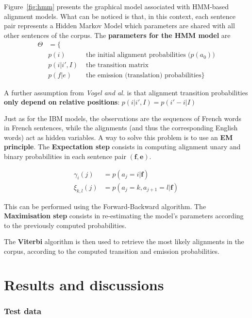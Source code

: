 \documentclass[final]{beamer}
\begin{document}
\begin{frame}[t]
\begin{multicols}{3}
Figure~\ref{fig:hmm} presents the graphical model associated with HMM-based alignment models. What can be noticed is that, in this context, each sentence pair represents a Hidden Markov Model which parameters are shared with all other sentences of the corpus.
The \textbf{parameters for the HMM model} are
\begin{align*}
\Theta &= \lbrace\\
& p(i) &\mbox{   the initial alignment probabilities ($p(a_0)$)}\\ 
& p(i|i',I) &\mbox{   the transition matrix}\\
& p(f|e) &\mbox{   the emission (translation) probabilities}\rbrace
\end{align*}

A further assumption from \textit{Vogel and al.} is that alignment transition probabilities \textbf{only depend on relative positions}: $p(i|i',I) = p(i'-i|I)$

Just as for the IBM models, the observations are the sequences of French words in French sentences, while the alignments (and thus the corresponding English words) act as hidden variables. A way to solve this problem is to use an \textbf{EM principle}.
The \textbf{Expectation step} consists in computing alignment unary and binary probabilities in each sentence pair $(\textbf{f},\textbf{e})$. 

\begin{align*}
\gamma_i(j) &= p(a_j=i|\textbf{f})\\
\xi_{k,l}(j) &= p(a_j=k,a_{j+1}=l|\textbf{f})
\end{align*}

This can be performed using the Forward-Backward algorithm.
The \textbf{Maximisation step} consists in re-estimating the model's parameters according to the previously computed probabilities.

The \textbf{Viterbi} algorithm is then used to retrieve the most likely alignments in the corpus, according to the computed transition and emission probabilities.

\section{Results and discussions}



\subsubsection{Test data}
 

\end{multicols}
\end{frame}
\end{document}

